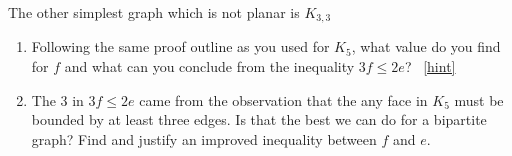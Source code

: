 \documentclass{book}
\begin{document}
\setcounter{project}{28}
\addtocounter{project}{-1}
\begin{activity}[]\label{activity-23}
\hypertarget{p-294}{}%
The other simplest graph which is not planar is \(K_{3,3}\)%
\begin{sidebyside}{1}{0.4}{0.4}{0}
\begin{sbspanel}{0.2}
\end{sbspanel}
\end{sidebyside}
\begin{enumerate}[font=\bfseries,label=(\alph*),ref=\alph*]
\item\label{task-39} \hypertarget{p-295}{}%
Following the same proof outline as you used for \(K_5\), what value do you find for \(f\) and what can you conclude from the inequality \(3f \le 2e\)?%
~\hfill{\tiny\hyperlink{a-28.a}{[hint]}\hypertarget{q-28.a}{}}\item\label{task-40} \hypertarget{p-297}{}%
The 3 in \(3f \le 2e\) came from the observation that the any face in \(K_5\) must be bounded by at least three edges.  Is that the best we can do for a bipartite graph?  Find and justify an improved inequality between \(f\) and \(e\).%
\end{enumerate}
\end{activity}
\end{document}
